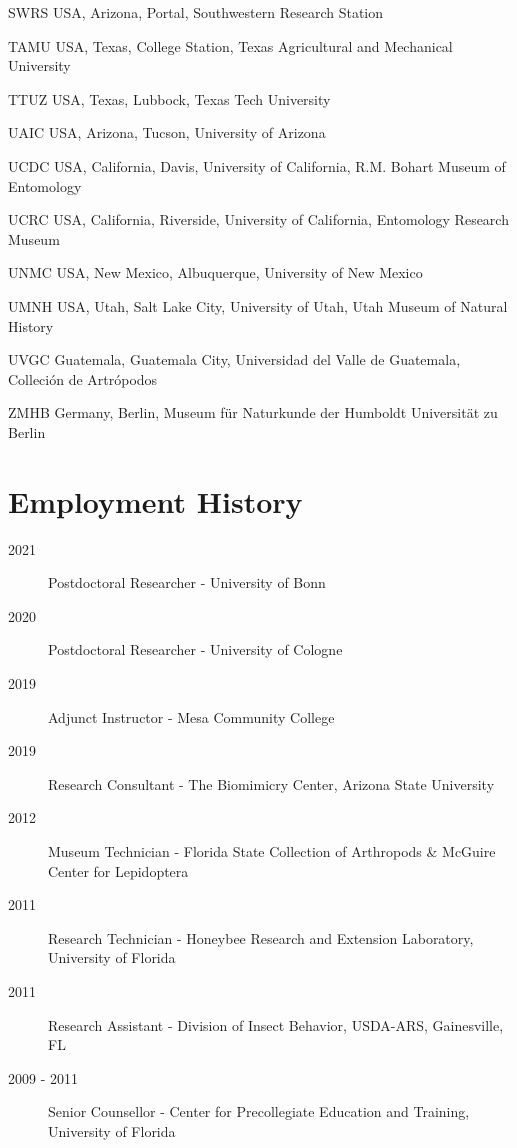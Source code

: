 \documentclass[12pt,a4paper]{article}
\begin{document}
\begin{collections}
	\item [SWRS] USA, Arizona, Portal, Southwestern Research Station
	\item [TAMU] USA, Texas, College Station, Texas Agricultural and Mechanical University
	\item [TTUZ] USA, Texas, Lubbock, Texas Tech University
	\item [UAIC] USA, Arizona, Tucson, University of Arizona
	\item [UCDC] USA, California, Davis, University of California, R.M. Bohart Museum of Entomology
	\item [UCRC] USA, California, Riverside, University of California, Entomology Research Museum
	\item [UNMC] USA, New Mexico, Albuquerque, University of New Mexico
	\item [UMNH] USA, Utah, Salt Lake City, University of Utah, Utah Museum of Natural History
	\item [UVGC] Guatemala, Guatemala City, Universidad del Valle de Guatemala, Colleci\'{o}n de Artr\'{o}podos
	\item [ZMHB] Germany, Berlin, Museum f\"{u}r Naturkunde der Humboldt Universit\"{a}t zu Berlin
\end{collections}

\section*{Employment History}
\begin{description}
	\item [2021] Postdoctoral Researcher - University of Bonn
	\item [2020] Postdoctoral Researcher - University of Cologne
	\item [2019] Adjunct Instructor - Mesa Community College
	\item [2019] Research Consultant - The Biomimicry Center, Arizona State University
	\item [2012] Museum Technician - Florida State Collection of Arthropods \& McGuire Center for Lepidoptera
	\item [2011] Research Technician - Honeybee Research and Extension Laboratory, University of Florida
	\item [2011] Research Assistant - Division of Insect Behavior, USDA-ARS, Gainesville, FL
	\item [2009 - 2011] Senior Counsellor - Center for Precollegiate Education and Training, University of Florida
\end{description}
\end{document}
